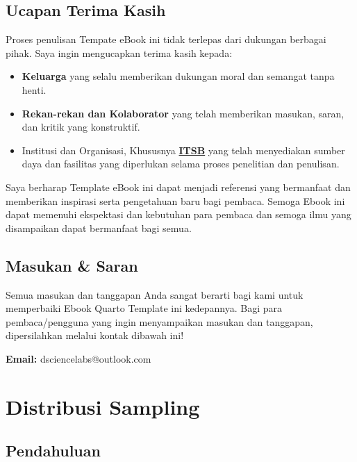 \documentclass[
  letterpaper,
]{book}
\providecommand{\tightlist}{%
  \setlength{\itemsep}{0pt}\setlength{\parskip}{0pt}}\usepackage{longtable,booktabs,array}
\begin{document}
\section*{Ucapan Terima Kasih}\label{ucapan-terima-kasih}


Proses penulisan Tempate eBook ini tidak terlepas dari dukungan berbagai
pihak. Saya ingin mengucapkan terima kasih kepada:

\begin{itemize}
\tightlist
\item
  \textbf{Keluarga} yang selalu memberikan dukungan moral dan semangat
  tanpa henti.
\item
  \textbf{Rekan-rekan dan Kolaborator} yang telah memberikan masukan,
  saran, dan kritik yang konstruktif.
\item
  Institusi dan Organisasi, Khususnya
  \textbf{\href{https://itsb.ac.id/}{ITSB}} yang telah menyediakan
  sumber daya dan fasilitas yang diperlukan selama proses penelitian dan
  penulisan.
\end{itemize}

Saya berharap Template eBook ini dapat menjadi referensi yang bermanfaat
dan memberikan inspirasi serta pengetahuan baru bagi pembaca. Semoga
Ebook ini dapat memenuhi ekspektasi dan kebutuhan para pembaca dan
semoga ilmu yang disampaikan dapat bermanfaat bagi semua.

\section*{Masukan \& Saran}\label{masukan-saran}


Semua masukan dan tanggapan Anda sangat berarti bagi kami untuk
memperbaiki Ebook Quarto Template ini kedepannya. Bagi para
pembaca/pengguna yang ingin menyampaikan masukan dan tanggapan,
dipersilahkan melalui kontak dibawah ini!

\textbf{Email:} dsciencelabs@outlook.com


\chapter{Distribusi Sampling}\label{distribusi-sampling}

\section{Pendahuluan}\label{pendahuluan}
\end{document}

